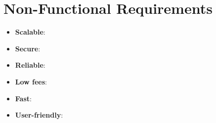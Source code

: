 \section{Non-Functional Requirements}

\begin{itemize}
    \item \textbf{Scalable}:
    \item \textbf{Secure}:
    \item \textbf{Reliable}:
    \item \textbf{Low fees}:
    \item \textbf{Fast}:
    \item \textbf{User-friendly}:
\end{itemize}
